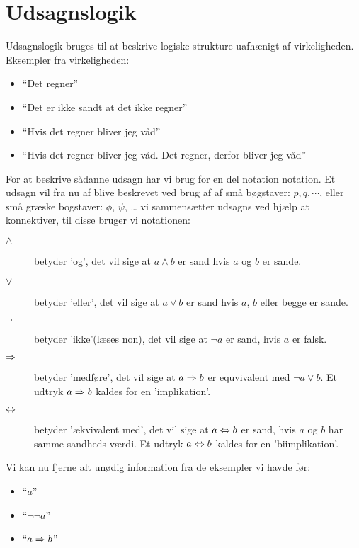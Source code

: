 \ifx\preampleIncluded\undefined
\def\startUdsagnslogik{}


\fi

\section{Udsagnslogik}
Udsagnslogik bruges til at beskrive logiske strukture uafhænigt af virkeligheden.
Eksempler fra virkeligheden:
\begin{itemize}
    \item ``Det regner''
    \item ``Det er ikke sandt at det ikke regner''
    \item ``Hvis det regner bliver jeg våd''
    \item ``Hvis det regner bliver jeg våd. Det regner, derfor bliver jeg våd''
\end{itemize}

For at beskrive sådanne udsagn har vi brug for en del notation notation. Et udsagn vil fra nu af blive beskrevet ved brug af af små bøgstaver: $p, q, \cdots$,
eller små græske bogstaver: $\phi$, $\psi$, \ldots
vi sammensætter udsagns ved hjælp at konnektiver, til disse bruger vi notationen:

\begin{description}
    \item[$\land$] betyder 'og', det vil sige at $a \land b$ er sand hvis $a$ og $b$ er sande.
    \item[$\lor$] betyder 'eller', det vil sige at $a \lor b$ er sand hvis $a$, $b$ eller begge er sande.
    \item[$\lnot$] betyder 'ikke'(læses non), det vil sige at $\lnot a$ er sand, hvis $a$ er falsk.
    \item[$\Rightarrow$] betyder 'medføre', det vil sige at $a \Rightarrow b$ er equvivalent med $\lnot a \lor b$. Et udtryk $a \Rightarrow b$ kaldes for en 'implikation'.
    \item[$\Leftrightarrow$] betyder 'ækvivalent med', det vil sige at $a \Leftrightarrow b$ er sand, hvis $a$ og $b$ har samme sandheds værdi. Et udtryk $a \Leftrightarrow b$ kaldes for en 'biimplikation'.
\end{description}

Vi kan nu fjerne alt unødig information fra de eksempler vi havde før:
\begin{itemize}
    \item ``$a$''
    \item ``$\lnot \lnot a$''
    \item ``$a \Rightarrow b$''
\end{itemize}


